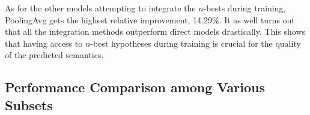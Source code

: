 As for the other models attempting to integrate the $n$-bests during training, PoolingAvg gets the highest relative improvement, 14.29\%. It as well turns out that all the integration methods outperform direct models drastically. This shows that having access to $n$-best hypotheses during training is crucial for the quality of the predicted semantics. 
\subsection{Performance Comparison among Various Subsets}

\begin{table}[ht]
	\centering
	\vspace{-1ex}
	\label{tbl:disagree}
\end{table}


